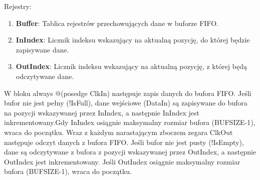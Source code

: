 \documentclass[12pt, a4paper]{article}
\begin{document}
\newline
Rejestry:
\begin{enumerate}
    \item \textbf{\fontsize{11}{10}\selectfont Buffer}: Tablica rejestrów przechowujących dane w buforze FIFO.
    \item \textbf{\fontsize{11}{10}\selectfont InIndex}: Licznik indeksu wskazujący na aktualną pozycję, do której będzie zapisywane dane.
    \item \textbf{\fontsize{11}{10}\selectfont OutIndex}: Licznik indeksu wskazujący na aktualną pozycję, z której będą odczytywane dane.
\end{enumerate}
W bloku always @(posedge ClkIn) następuje zapis danych do bufora FIFO. Jeśli bufor nie jest pełny (!IsFull), dane wejściowe (DataIn) są zapisywane do bufora na pozycji wskazywanej przez InIndex, a następnie InIndex jest inkrementowany.Gdy InIndex osiągnie maksymalny rozmiar bufora (BUFSIZE-1), wraca do początku.
Wraz z każdym narastającym zboczem zegara ClkOut następuje odczyt danych z bufora FIFO. Jeśli bufor nie jest pusty (!IsEmpty), dane są odczytywane z bufora z pozycji wskazywanej przez OutIndex, a następnie OutIndex jest inkrementowany. Jeśli OutIndex osiągnie maksymalny rozmiar bufora (BUFSIZE-1), wraca do początku.
\end{document}
